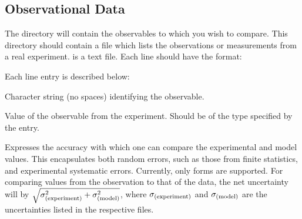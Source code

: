 \subsection{Observational Data}
The  directory will contain the observables to which you wish to compare. This directory should contain a file  which lists the observations or measurements from a real experiment.  is a text file. Each line should have the format:


Each line entry is described below:

\begin{description}



\item {}

Character string (no spaces) identifying the observable.

\item {}

Value of the observable from the experiment. Should be of the type specified by the  entry.

\item {}

Expresses the accuracy with which one can compare the experimental and model values. This encapsulates both random errors, such as those from finite statistics, and experimental systematic errors. Currently, only  forms are supported. For comparing  values from the observation to that of the data, the net uncertainty will by $\sqrt{\sigma_{\rm(experiment)}^2+\sigma_{\rm(model)}^2}$, where $\sigma_{\rm(experiment)}$ and $\sigma_{\rm(model)}$ are the uncertainties listed in the respective  files.

\end{description}



